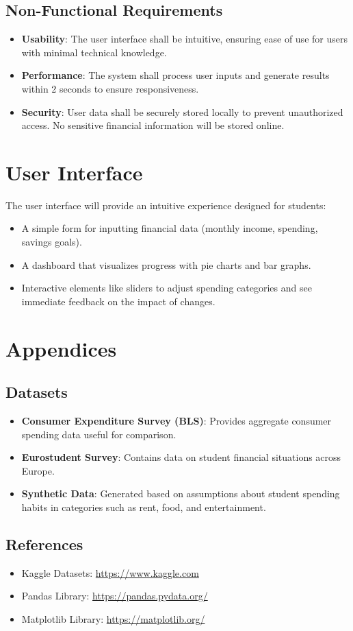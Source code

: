\documentclass{article}
\begin{document}
\subsection{Non-Functional Requirements}
\begin{itemize}
    \item \textbf{Usability}: The user interface shall be intuitive, ensuring ease of use for users with minimal technical knowledge.
    \item \textbf{Performance}: The system shall process user inputs and generate results within 2 seconds to ensure responsiveness.
    \item \textbf{Security}: User data shall be securely stored locally to prevent unauthorized access. No sensitive financial information will be stored online.
\end{itemize}

\section{User Interface}
The user interface will provide an intuitive experience designed for students:
\begin{itemize}
    \item A simple form for inputting financial data (monthly income, spending, savings goals).
    \item A dashboard that visualizes progress with pie charts and bar graphs.
    \item Interactive elements like sliders to adjust spending categories and see immediate feedback on the impact of changes.
\end{itemize}

\section{Appendices}
\subsection{Datasets}
\begin{itemize}
    \item \textbf{Consumer Expenditure Survey (BLS)}: Provides aggregate consumer spending data useful for comparison.
    \item \textbf{Eurostudent Survey}: Contains data on student financial situations across Europe.
    \item \textbf{Synthetic Data}: Generated based on assumptions about student spending habits in categories such as rent, food, and entertainment.
\end{itemize}

\subsection{References}
\begin{itemize}
    \item Kaggle Datasets: \url{https://www.kaggle.com}
    \item Pandas Library: \url{https://pandas.pydata.org/}
    \item Matplotlib Library: \url{https://matplotlib.org/}
\end{itemize}
\end{document}
